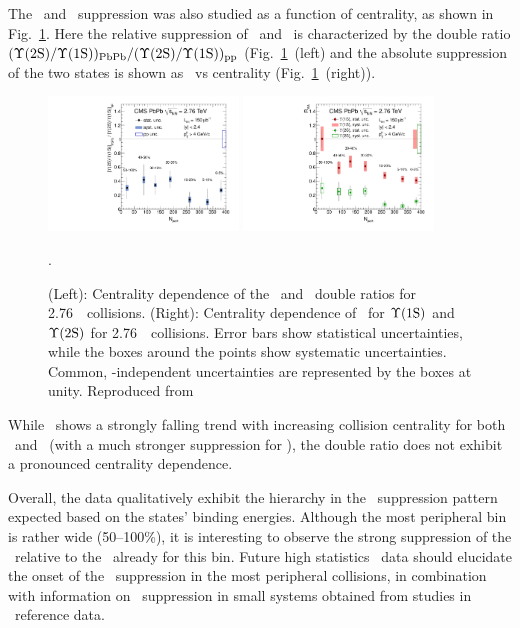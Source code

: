 The \PgUa\ and \PgUb\ suppression was also studied as a function of centrality,
as shown in Fig.~\ref{fig:GR:centrality}.
Here the relative suppression of \PgUa\ and \PgUb\ is characterized by
the double ratio \linebreak $({\Upsilon\mathrm{(2S)}/\Upsilon\mathrm{(1S)}})_{\rm PbPb}/({\Upsilon\mathrm{(2S)}/\Upsilon\mathrm{(1S)}})_{\rm pp}$
(Fig.~\ref{fig:GR:centrality}~(left) and the absolute suppression
of the two states is shown as \Raa\ vs centrality (Fig.~\ref{fig:GR:centrality}~(right)).

\begin{figure}[t]
\begin{center}
   \includegraphics[width=0.45\textwidth]{qqbarfigures/chi2VsCent}
   \includegraphics[width=0.45\textwidth]{qqbarfigures/RaaPt4}
  \caption{(Left): Centrality dependence of the \PgUa\ and \PgUb\ double ratios
for 2.76\TeV\ \PbPb\ collisions.  (Right):
Centrality dependence of \Raa\ for $\Upsilon\mathrm{(1S)}$ and $\Upsilon\mathrm{(2S)}$ for 2.76\TeV\ \PbPb\ collisions.
Error bars show statistical uncertainties, while the boxes around the points
show systematic uncertainties. Common, \npart-independent
uncertainties are represented by the boxes at unity. Reproduced from~\cite{Chatrchyan:2012lxa}}.
\label{fig:GR:centrality}
\end{center}
\end{figure}

While \Raa\ shows a strongly falling trend with increasing collision centrality
for both \PgUa\ and \PgUb\ (with a much stronger suppression for \PgUb), the
double ratio does not exhibit a pronounced centrality dependence.

Overall, the data qualitatively exhibit the hierarchy in the \PgUn\ suppression pattern
expected based on the states' binding energies. Although the most peripheral bin
is rather wide (50--100\%), it is interesting to observe the strong suppression of the
\PgUb\ relative to the \PgUa\ already for this bin. Future high statistics \PbPb\ data
should elucidate the onset of the \PgU\ suppression in the most peripheral collisions,
in combination with information on \PgU\ suppression in small systems obtained from
studies in \pPb\ reference data.

